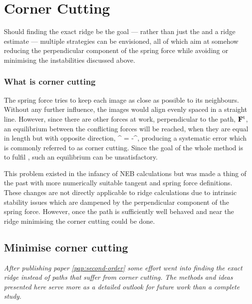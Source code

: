 \section{Corner Cutting}
\label{sec:erm-corner-cutting}

Should finding the exact ridge be the goal --- rather than just the  and a ridge estimate --- multiple strategies can be envisioned, all of which aim at somehow reducing the perpendicular component of the spring force while avoiding or minimising the instabilities discussed above.

\subsubsection{What is corner cutting}
The spring force tries to keep each image as close as possible to its neighbours.
Without any further influence, the images would align evenly spaced in a straight line.
However, since there are other forces at work, perpendicular to the path, ${\mathrm{\mathbf{\bm{F}}}}^\text{t}$, an equilibrium between the conflicting forces will be reached, when they are equal in length but with opposite direction,
\vF^{\perp} = -\vF^,
\eeq
producing a systematic error which is commonly referred to as corner cutting.
Since the goal of the whole method is to fulfil , such an equilibrium can be unsatisfactory.

This problem existed in the infancy of NEB calculations but was made a thing of the past with more numerically suitable tangent and spring force definitions.~\cite{neb-tangent-2000}
These changes are not directly applicable to ridge calculations due to intrinsic stability issues which are dampened by the perpendicular component of the spring force.
However, once the path is sufficiently well behaved and near the ridge minimising the corner cutting could be done.


\subsection{Minimise corner cutting}
\textit{After publishing paper \ref{pap:second-order} some effort went into finding the exact ridge instead of paths that suffer from corner cutting.
The methods and ideas presented here serve more as a detailed outlook for future work than a complete study.}
\vspace{1em}

